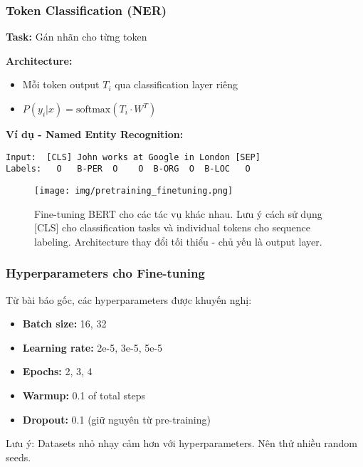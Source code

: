 \subsubsection{Token Classification (NER)}
\textbf{Task:} Gán nhãn cho từng token

\textbf{Architecture:}
\begin{itemize}
    \item Mỗi token output $T_i$ qua classification layer riêng
    \item $P(y_i|x) = \text{softmax}(T_i \cdot W^T)$
\end{itemize}

\textbf{Ví dụ - Named Entity Recognition:}
\begin{verbatim}
Input:  [CLS] John works at Google in London [SEP]
Labels:   O   B-PER  O    O  B-ORG  O  B-LOC   O
\end{verbatim}

\begin{figure}[H]
    \centering
    \texttt{[image: img/pretraining\_finetuning.png]}
    \caption{Fine-tuning BERT cho các tác vụ khác nhau. Lưu ý cách sử dụng [CLS] cho classification tasks và individual tokens cho sequence labeling. Architecture thay đổi tối thiểu - chủ yếu là output layer.}
    \label{fig:bert_finetuning_tasks}
\end{figure}

\subsubsection{Hyperparameters cho Fine-tuning}
Từ bài báo gốc, các hyperparameters được khuyến nghị:
\begin{itemize}
    \item \textbf{Batch size:} 16, 32
    \item \textbf{Learning rate:} 2e-5, 3e-5, 5e-5 
    \item \textbf{Epochs:} 2, 3, 4
    \item \textbf{Warmup:} 0.1 of total steps
    \item \textbf{Dropout:} 0.1 (giữ nguyên từ pre-training)
\end{itemize}

Lưu ý: Datasets nhỏ nhạy cảm hơn với hyperparameters. Nên thử nhiều random seeds.

